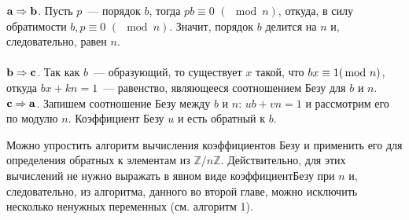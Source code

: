     \begin{myproof}
    ${\bf {a \Rightarrow b}}$. Пусть $p$~— порядок $b$, тогда $pb \equiv 0\,\,(\!\!\!\mod{n})$, откуда, в силу обратимости $b, p \equiv 0\,\,(\!\!\!\mod{n})$.
    Значит, порядок $b$ делится на $n$ и, следовательно, равен $n$.\\\\
    ${\bf {b \Rightarrow c}}$. Так как $b$~— образующий, то существует $x$ такой, что $bx \equiv 1\linebreak(\!\!\!\mod{n})$, откуда $bx + kn = 1$~— равенство, являющееся соотношением Безу для $b$ и $n$.\\

    \noindent${\bf{c \Rightarrow a}}$. Запишем соотношение Безу между $b$ и $n$: $u b + v n = 1$ и рассмотрим его по модулю $n$. Коэффициент Безу $u$ и есть обратный к $b$.
    \end{myproof}
    \newpage
    Можно упростить алгоритм вычисления коэффициентов Безу и применить его для определения обратных к элементам из $\mathbb{Z}/n\mathbb{Z}$. Действительно, для этих вычислений не нужно выражать в явном виде коэффициент\linebreak Безу при $n$ и, следовательно, из алгоритма, данного во второй главе, можно исключить несколько ненужных переменных (см. алгоритм 1).

